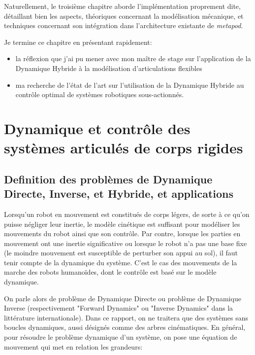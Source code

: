 \documentclass{report}
\begin{document}
Naturellement, le troisième chapitre aborde l'implémentation proprement dite, détaillant bien les aspects, théoriques concernant la modélisation mécanique, et techniques concernant son intégration dans l'architecture existante de \emph{metapod}.

Je termine ce chapitre en présentant rapidement:
\begin{itemize}
\item la réflexion que j'ai pu mener avec mon maître de stage sur l'application de la Dynamique Hybride à la modélisation d'articulations flexibles
\item ma recherche de l'état de l'art sur l'utilisation de la Dynamique Hybride au contrôle optimal de systèmes robotiques sous-actionnés.
\end{itemize}




\chapter{Dynamique et contrôle des systèmes articulés de corps rigides}

\section{Definition des problèmes de Dynamique Directe, Inverse, et Hybride, et applications} \label{ch_concepts_definitions}

Lorsqu'un robot en mouvement est constitués de corps légers, de sorte à ce qu'on puisse négliger leur inertie, le modèle cinétique est suffisant pour modéliser les mouvements du robot ainsi que son contrôle. Par contre, lorsque les parties en mouvement ont une inertie significative ou lorsque le robot n'a pas une base fixe (le moindre mouvement est susceptible de perturber son appui au sol), il faut tenir compte de la dynamique du système. C'est le cas des mouvements de la marche des robots humanoïdes, dont le contrôle est basé sur le modèle dynamique.

On parle alors de problème de Dynamique Directe ou problème de Dynamique Inverse (respectivement "Forward Dynamics" ou "Inverse Dynamics" dans la littérature internationale). Dans ce rapport, on ne traitera que des systèmes sans boucles dynamiques, aussi désignés comme des arbres cinématiques. En général, pour résoudre le problème dynamique d'un système, on pose une équation de mouvement qui met en relation les grandeurs:
\end{document}
